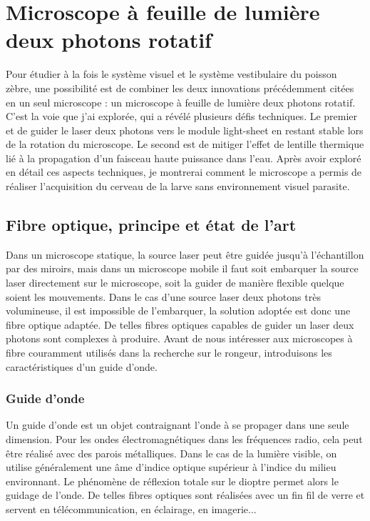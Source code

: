 \chapter{Microscope à feuille de lumière deux photons rotatif}

Pour étudier à la fois le système visuel et le système vestibulaire du poisson zèbre, une possibilité est de combiner les deux innovations précédemment citées en un seul microscope : un microscope à feuille de lumière deux photons rotatif. C'est la voie que j'ai explorée, qui a révélé plusieurs défis techniques. Le premier et de guider le laser deux photons vers le module light-sheet en restant stable lors de la rotation du microscope. Le second est de mitiger l'effet de lentille thermique lié à la propagation d'un faisceau haute puissance dans l'eau. Après avoir exploré en détail ces aspects techniques, je montrerai comment le microscope a permis de réaliser l'acquisition du cerveau de la larve sans environnement visuel parasite.

\section{Fibre optique, principe et état de l'art}

Dans un microscope statique, la source laser peut être guidée jusqu'à l'échantillon par des miroirs, mais dans un microscope mobile il faut soit embarquer la source laser directement sur le microscope, soit la guider de manière flexible quelque soient les mouvements. Dans le cas d'une source laser deux photons très volumineuse, il est impossible de l'embarquer, la solution adoptée est donc une fibre optique adaptée. De telles fibres optiques capables de guider un laser deux photons sont complexes à produire. Avant de nous intéresser aux microscopes à fibre couramment utilisés dans la recherche sur le rongeur, introduisons les caractéristiques d'un guide d'onde. 

\subsection{Guide d'onde}

Un guide d'onde est un objet contraignant l'onde à se propager dans une seule dimension. Pour les ondes électromagnétiques dans les fréquences radio, cela peut être réalisé avec des parois métalliques. Dans le cas de la lumière visible, on utilise généralement une âme d'indice optique supérieur à l'indice du milieu environnant. Le phénomène de réflexion totale sur le dioptre permet alors le guidage de l'onde. De telles fibres optiques sont réalisées avec un fin fil de verre et servent en télécommunication, en éclairage, en imagerie...

